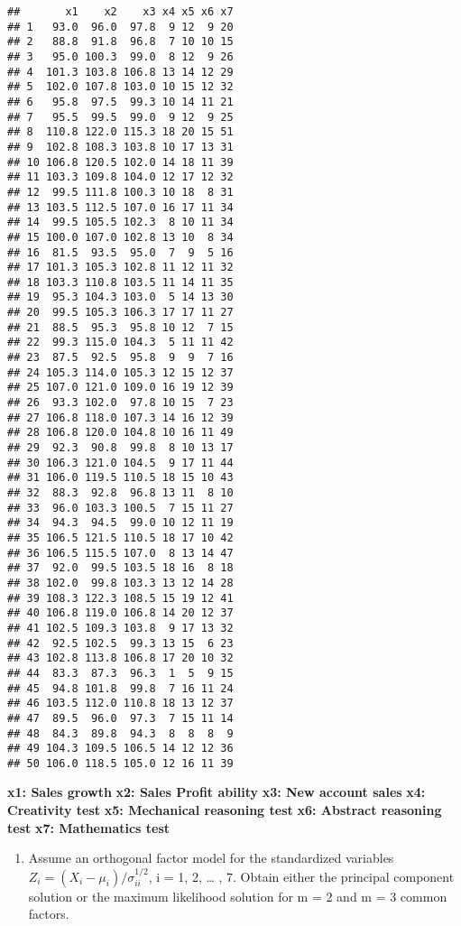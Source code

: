 \documentclass[
]{article}
\providecommand{\tightlist}{%
  \setlength{\itemsep}{0pt}\setlength{\parskip}{0pt}}
\begin{document}
\begin{verbatim}
##       x1    x2    x3 x4 x5 x6 x7
## 1   93.0  96.0  97.8  9 12  9 20
## 2   88.8  91.8  96.8  7 10 10 15
## 3   95.0 100.3  99.0  8 12  9 26
## 4  101.3 103.8 106.8 13 14 12 29
## 5  102.0 107.8 103.0 10 15 12 32
## 6   95.8  97.5  99.3 10 14 11 21
## 7   95.5  99.5  99.0  9 12  9 25
## 8  110.8 122.0 115.3 18 20 15 51
## 9  102.8 108.3 103.8 10 17 13 31
## 10 106.8 120.5 102.0 14 18 11 39
## 11 103.3 109.8 104.0 12 17 12 32
## 12  99.5 111.8 100.3 10 18  8 31
## 13 103.5 112.5 107.0 16 17 11 34
## 14  99.5 105.5 102.3  8 10 11 34
## 15 100.0 107.0 102.8 13 10  8 34
## 16  81.5  93.5  95.0  7  9  5 16
## 17 101.3 105.3 102.8 11 12 11 32
## 18 103.3 110.8 103.5 11 14 11 35
## 19  95.3 104.3 103.0  5 14 13 30
## 20  99.5 105.3 106.3 17 17 11 27
## 21  88.5  95.3  95.8 10 12  7 15
## 22  99.3 115.0 104.3  5 11 11 42
## 23  87.5  92.5  95.8  9  9  7 16
## 24 105.3 114.0 105.3 12 15 12 37
## 25 107.0 121.0 109.0 16 19 12 39
## 26  93.3 102.0  97.8 10 15  7 23
## 27 106.8 118.0 107.3 14 16 12 39
## 28 106.8 120.0 104.8 10 16 11 49
## 29  92.3  90.8  99.8  8 10 13 17
## 30 106.3 121.0 104.5  9 17 11 44
## 31 106.0 119.5 110.5 18 15 10 43
## 32  88.3  92.8  96.8 13 11  8 10
## 33  96.0 103.3 100.5  7 15 11 27
## 34  94.3  94.5  99.0 10 12 11 19
## 35 106.5 121.5 110.5 18 17 10 42
## 36 106.5 115.5 107.0  8 13 14 47
## 37  92.0  99.5 103.5 18 16  8 18
## 38 102.0  99.8 103.3 13 12 14 28
## 39 108.3 122.3 108.5 15 19 12 41
## 40 106.8 119.0 106.8 14 20 12 37
## 41 102.5 109.3 103.8  9 17 13 32
## 42  92.5 102.5  99.3 13 15  6 23
## 43 102.8 113.8 106.8 17 20 10 32
## 44  83.3  87.3  96.3  1  5  9 15
## 45  94.8 101.8  99.8  7 16 11 24
## 46 103.5 112.0 110.8 18 13 12 37
## 47  89.5  96.0  97.3  7 15 11 14
## 48  84.3  89.8  94.3  8  8  8  9
## 49 104.3 109.5 106.5 14 12 12 36
## 50 106.0 118.5 105.0 12 16 11 39
\end{verbatim}

\textbf{x1: Sales growth} \textbf{x2: Sales Profit ability} \textbf{x3:
New account sales} \textbf{x4: Creativity test} \textbf{x5: Mechanical
reasoning test} \textbf{x6: Abstract reasoning test} \textbf{x7:
Mathematics test}

\begin{enumerate}
\def\labelenumi{(\alph{enumi})}
\tightlist
\item
  Assume an orthogonal factor model for the standardized variables
  \(Z_{i} = (X_{i} - \mu_{i})/ \sigma_{ii}^{1/2}\), i = 1, 2, \ldots{} ,
  7. Obtain either the principal component solution or the maximum
  likelihood solution for m = 2 and m = 3 common factors.
\end{enumerate}
\end{document}
